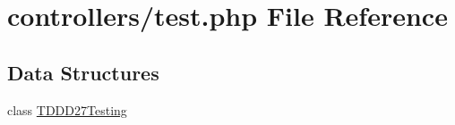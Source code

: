 \hypertarget{test_8php}{}\section{controllers/test.php File Reference}
\label{test_8php}
\subsection*{Data Structures}
\begin{DoxyCompactItemize}
\item 
class \mbox{\hyperlink{class_t_d_d_d27_testing}{T\+D\+D\+D27\+Testing}}
\end{DoxyCompactItemize}
